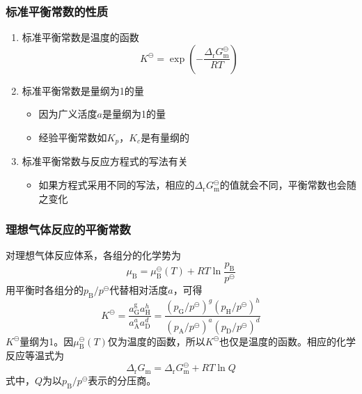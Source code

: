\begin{frame}
    \frametitle{标准平衡常数的性质}
    \begin{enumerate}
      \item 标准平衡常数是温度的函数
        \[
            K^{\ominus}=\exp(-\frac{\Delta _\mathrm{r}G_\mathrm{m}^\ominus}{RT})
        \]
      \item 标准平衡常数是量纲为1的量
        \begin{itemize}
          \item 因为广义活度$a$是量纲为1的量
          \item 经验平衡常数如$K_p$，$K_c$是有量纲的
        \end{itemize}
      \item 标准平衡常数与反应方程式的写法有关
        \begin{itemize}
          \item 如果方程式采用不同的写法，相应的$\Delta _\mathrm{r}G_\mathrm{m}^\ominus$的值就会不同，平衡常数也会随之变化
        \end{itemize}
    \end{enumerate}
\end{frame}


\begin{frame}
    \frametitle{理想气体反应的平衡常数}

    对理想气体反应体系，各组分的化学势为
    \[
        \mu_{\mathrm{B}}=\mu_{\mathrm{B}}^{\ominus}(T)+R T \ln \frac{p_{\mathrm{B}}}{p^{\ominus}}
    \]
    用平衡时各组分的$p_\mathrm{B}/p^\ominus$代替相对活度$a$，可得
    \[
        K^{\ominus}=\frac{a_{\mathrm{G}}^{\mathrm{g}} a_{\mathrm{H}}^{h}}{a_{\mathrm{A}}^{a} a_{\mathrm{D}}^{d}}=\frac{(p_{\mathrm{G}} / p^{\ominus})^{g}(p_{\mathrm{H}} / p^{\ominus})^{h}}{(p_{\mathrm{A}} / p^{\ominus})^{a}(p_{\mathrm{D}} / p^{\ominus})^{d}}
    \]
    $K^{\ominus}$量纲为1。因$\mu_{\mathrm{B}}^{\ominus}(T)$仅为温度的函数，所以$K^{\ominus}$也仅是温度的函数。相应的化学反应等温式为
    \[
        \Delta _\mathrm{r}G_\mathrm{m}=\Delta _\mathrm{r}G_\mathrm{m}^\ominus + RT \ln Q
    \]
    式中，$Q$为以$p_\mathrm{B}/p^\ominus$表示的分压商。

\end{frame}



